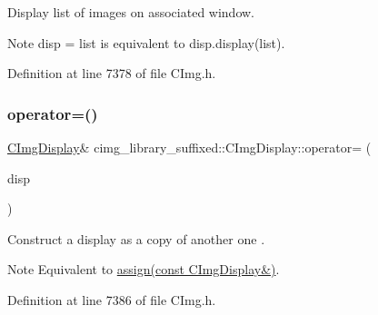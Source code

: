 Display list of images on associated window. 

\begin{DoxyNote}{Note}
{\ttfamily disp = list} is equivalent to {\ttfamily disp.\+display(list)}. 
\end{DoxyNote}


Definition at line 7378 of file C\+Img.\+h.

\mbox{\label{structcimg__library__suffixed_1_1CImgDisplay_a388d50e8afcbc70eb32cd23c0c556416}} 
\subsubsection{\texorpdfstring{operator=()}{operator=()}\hspace{0.1cm}{\footnotesize\ttfamily [3/3]}}
{\footnotesize\ttfamily \hyperlink{structcimg__library__suffixed_1_1CImgDisplay}{C\+Img\+Display}\& cimg\+\_\+library\+\_\+suffixed\+::\+C\+Img\+Display\+::operator= (\begin{DoxyParamCaption}\item[{const \hyperlink{structcimg__library__suffixed_1_1CImgDisplay}{C\+Img\+Display} \&}]{disp }\end{DoxyParamCaption})\hspace{0.3cm}{\ttfamily [inline]}}



Construct a display as a copy of another one . 

\begin{DoxyNote}{Note}
Equivalent to \hyperlink{structcimg__library__suffixed_1_1CImgDisplay_a6639c2ca1ccb868ed1bdf39741518313}{assign(const C\+Img\+Display\&)}. 
\end{DoxyNote}


Definition at line 7386 of file C\+Img.\+h.

\mbox{\label{structcimg__library__suffixed_1_1CImgDisplay_aff557cf3b60169ddfd4336b37c653fe0}} 
